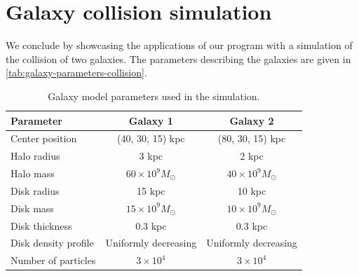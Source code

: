 \section{Galaxy collision simulation}
We conclude by showcasing the applications of our program with a simulation of the collision of two galaxies.
The parameters describing the galaxies are given in \autoref{tab:galaxy-parameters-collision}.
\begin{table}[htp]
    \centering
    \begin{tabular}{|l|c|c|}
        \hline
        \textbf{Parameter}   & \textbf{Galaxy 1}        & \textbf{Galaxy 2}        \\
        \hline
        Center position      & (40, 30, 15) kpc         & (80, 30, 15) kpc         \\
        Halo radius          & 3 kpc                    & 2 kpc                    \\
        Halo mass            & $60 \times 10^9 M_\odot$ & $40 \times 10^9 M_\odot$ \\
        Disk radius          & 15 kpc                   & 10 kpc                   \\
        Disk mass            & $15 \times 10^9 M_\odot$ & $10 \times 10^9 M_\odot$ \\
        Disk thickness       & 0.3 kpc                  & 0.3 kpc                  \\
        Disk density profile & Uniformly decreasing     & Uniformly decreasing     \\
        Number of particles  & $3 \times 10^4$          & $3 \times 10^4$          \\
        \hline
    \end{tabular}
    \caption{Galaxy model parameters used in the simulation.}
    \label{tab:galaxy-parameters-collision}
\end{table}
